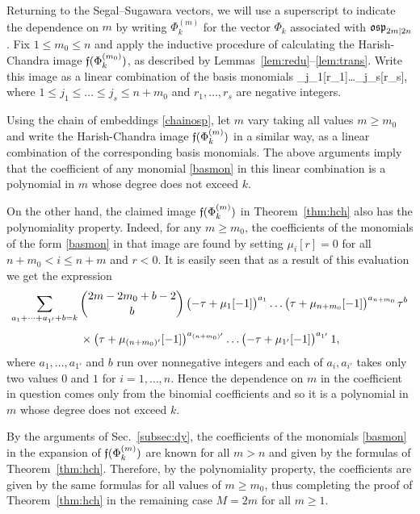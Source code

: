 \documentclass[12pt]{article}
\begin{document}
Returning to the Segal--Sugawara vectors, we will use
a superscript to indicate the dependence on $m$ by writing $\Phi^{(m)}_k$
for the vector $\Phi_k$ associated with $\mathfrak{osp}_{2m|2n}$. Fix $1\leqslant m_0\leqslant n$
and apply the inductive procedure of calculating the
Harish-Chandra image $\mathfrak{f}(\Phi^{(m_0)}_k)$, as described by Lemmas~\ref{lem:redu}--\ref{lem:trans}.
Write this image
as a linear combination of the basis monomials
\mu_{j_1}[r_1]\dots \mu_{j_s}[r_s],
\eeq
where $1\leqslant j_1\leqslant\dots\leqslant j_s\leqslant n+m_0$ and $r_1,\dots,r_s$
are negative integers.

Using the chain of embeddings \eqref{chainosp},
let $m$ vary taking all values $m\geqslant m_0$ and write the
Harish-Chandra image $\mathfrak{f}(\Phi^{(m)}_k)$ in a similar way, as a linear combination of the
corresponding basis monomials.
The above arguments imply that
the coefficient of any monomial \eqref{basmon} in this linear combination
is a polynomial in $m$ whose degree does not exceed $k$.

On the other hand, the claimed image $\mathfrak{f}(\Phi^{(m)}_k)$ in Theorem~\ref{thm:hch}
also has the polynomiality property. Indeed, for any $m\geqslant m_0$, the coefficients
of the monomials of the form \eqref{basmon} in that image
are found by setting $\mu_i[r]=0$ for all $n+m_0<i\leqslant n+m$ and $r<0$.
It is easily seen that
as a result of this evaluation we get the expression
\begin{multline}\label{evalmuz}
\sum_{a_1+\dots+a_{1'}+b=k}\binom{2m-2m_0+b-2}{b}\,
\big({-}\tau+\mu_{1}[-1]\big)^{a_1}\dots \big(\tau+\mu_{n+m_0}[-1]\big)^{a_{n+m_0}}\hspace{1pt} \tau^b\\[0.4em]
{}\times \big(\tau+\mu_{(n+m_0)'}[-1]\big)^{a_{(n+m_0)'}}\dots \big({-}\tau+\mu_{1'}[-1]\big)^{a_{1'}}\, 1,
\end{multline}
where $a_1,\dots,a_{1'}$ and $b$ run over nonnegative integers and each of $a_i,a_{i'}$
takes only two values $0$ and $1$ for $i=1,\dots,n$.
Hence the dependence on $m$ in the coefficient in question comes only from the binomial coefficients
and so it is a polynomial in $m$ whose degree does not exceed $k$.

By the arguments of Sec.~\ref{subsec:dy},
the coefficients
of the monomials \eqref{basmon}
in the expansion of $\mathfrak{f}(\Phi^{(m)}_k)$
are known for all $m>n$ and given by the formulas of Theorem~\ref{thm:hch}.
Therefore, by the polynomiality property, the
coefficients are given by the same formulas for all values of $m\geqslant m_0$,
thus completing the proof of Theorem~\ref{thm:hch} in the remaining case $M=2m$
for all $m\geqslant 1$.
\end{document}
